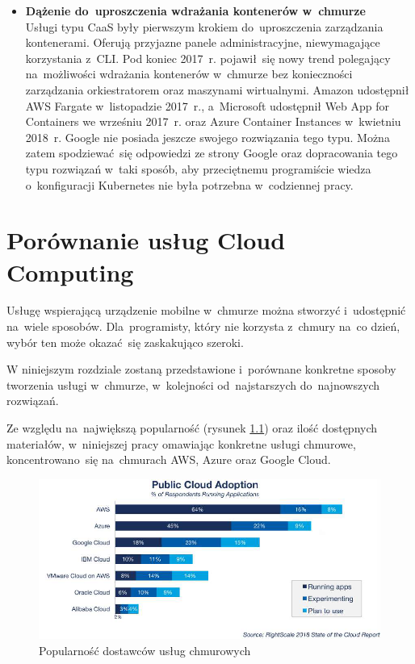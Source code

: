 \documentclass[12pt,a4paper,twoside,titlepage,openright]{book}
\begin{document}
\begin{itemize}
\item \textbf{Dążenie do~uproszczenia wdrażania kontenerów w~chmurze} \\
Usługi typu CaaS były pierwszym krokiem do~uproszczenia zarządzania kontenerami. Oferują przyjazne panele administracyjne, niewymagające korzystania z~CLI. Pod koniec 2017~r. pojawił~się nowy trend polegający na~możliwości wdrażania kontenerów w~chmurze bez konieczności zarządzania orkiestratorem oraz maszynami wirtualnymi. Amazon udostępnił AWS Fargate w~listopadzie 2017~r.,\cite{siteAwsFargateIntroducing} a~Microsoft udostępnił Web App for Containers we wrześniu 2017~r.\cite{siteAzureWebAppContainersAvailable} oraz Azure Container Instances w~kwietniu 2018~r.\cite{siteAzureContainerInstancesIntroducing} Google nie posiada jeszcze swojego rozwiązania tego typu. Można zatem spodziewać~się odpowiedzi ze strony Google oraz dopracowania tego typu rozwiązań w~taki sposób, aby przeciętnemu programiście wiedza o~konfiguracji Kubernetes nie była potrzebna w~codziennej pracy.

\end{itemize}

\chapter{Porównanie usług Cloud Computing}

Usługę wspierającą urządzenie mobilne w~chmurze można stworzyć i~udostępnić na~wiele sposobów. Dla~programisty, który nie korzysta z~chmury na~co dzień, wybór ten może okazać~się zaskakująco szeroki.

W niniejszym rozdziale zostaną przedstawione i~porównane konkretne sposoby tworzenia usługi w~chmurze, w~kolejności od~najstarszych do~najnowszych rozwiązań.

Ze względu na~największą popularność (rysunek \ref{fig:popularnosc}) oraz ilość dostępnych materiałów, w~niniejszej pracy omawiając konkretne usługi chmurowe, koncentrowano~się na~chmurach AWS, Azure oraz Google Cloud.

\begin{figure}[h]
	\centering
			\includegraphics[width=\textwidth]{popularnosc.png}
		\caption{Popularność dostawców usług chmurowych \cite{rightscaleReport}}
		\label{fig:popularnosc}
\end{figure}
\end{document}

